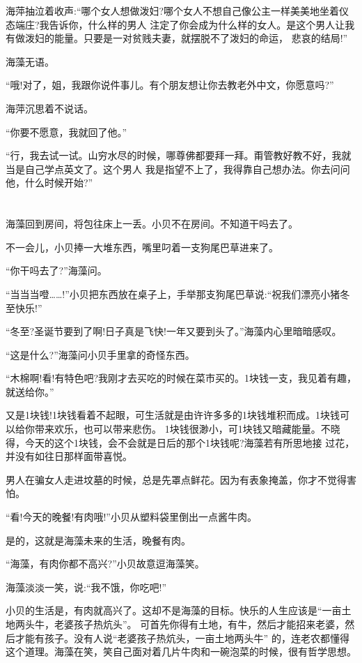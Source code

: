 \documentclass[11pt,a4paper,onecolumn]{article}
\begin{document}
海萍抽泣着收声:``哪个女人想做泼妇?哪个女人不想自己像公主一样美美地坐着仪态端庄?我告诉你，什么样的男人
注定了你会成为什么样的女人。是这个男人让我有做泼妇的能量。只要是一对贫贱夫妻，就摆脱不了泼妇的命运，
悲哀的结局!''

海藻无语。

``哦!对了，姐，我跟你说件事儿。有个朋友想让你去教老外中文，你愿意吗?''

海萍沉思着不说话。

``你要不愿意，我就回了他。''

``行，我去试一试。山穷水尽的时候，哪尊佛都要拜一拜。甭管教好教不好，我就当是自己学点英文了。这个男人
我是指望不上了，我得靠自己想办法。你去问问他，什么时候开始?''

\section[\thesection]{}

海藻回到房间，将包往床上一丢。小贝不在房间。不知道干吗去了。

不一会儿，小贝捧一大堆东西，嘴里叼着一支狗尾巴草进来了。

``你干吗去了?''海藻问。

``当当当噔……!''小贝把东西放在桌子上，手举那支狗尾巴草说:``祝我们漂亮小猪冬至快乐!''

``冬至?圣诞节要到了啊!日子真是飞快!一年又要到头了。''海藻内心里暗暗感叹。

``这是什么?''海藻问小贝手里拿的奇怪东西。

``木棉啊!看!有特色吧?我刚才去买吃的时候在菜市买的。1块钱一支，我见着有趣，就送给你。''

又是1块钱!1块钱看着不起眼，可生活就是由许许多多的1块钱堆积而成。1块钱可以给你带来欢乐，也可以带来悲伤。
1块钱很渺小，可1块钱又暗藏能量。不晓得，今天的这个1块钱，会不会就是日后的那个1块钱呢?海藻若有所思地接
过花，并没有如往日那样面带喜悦。

男人在骗女人走进坟墓的时候，总是先罩点鲜花。因为有表象掩盖，你才不觉得害怕。

``看!今天的晚餐!有肉哦!''小贝从塑料袋里倒出一点酱牛肉。

是的，这就是海藻未来的生活，晚餐有肉。

``海藻，有肉你都不高兴?''小贝故意逗海藻笑。

海藻淡淡一笑，说:``我不饿，你吃吧!''

小贝的生活是，有肉就高兴了。这却不是海藻的目标。快乐的人生应该是``一亩土地两头牛，老婆孩子热炕头''。
可首先你得有土地，有牛，然后才能招来老婆，然后才能有孩子。没有人说``老婆孩子热炕头，一亩土地两头牛''
的，连老农都懂得这个道理。海藻在笑，笑自己面对着几片牛肉和一碗泡菜的时候，很有哲学思想。
\end{document}
